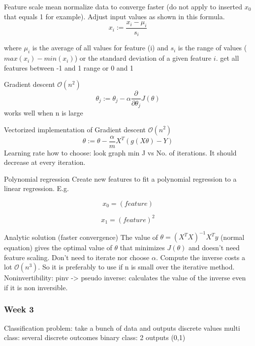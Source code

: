 \documentclass[12pt,a4paper]{report}
\begin{document}
Feature scale
	mean normalize data to converge faster (do not apply to inserted $ x_{0} $ that equals 1 for example). Adjust input values as shown in this formula.
	\begin{equation}
	x_{i} := \frac{x_{i}-\mu_{i}}{s_{i}}
	\end{equation}
	
	where $ \mu_{i} $ is the average of all values for feature (i) and $ s_{i} $ is the range of values ($ max(x_{i})-min(x_{i}) $) or the standard deviation of a given feature $ i $.
	get all features between -1 and 1 range or 0 and 1
	
Gradient descent $\mathcal{O}(n^{2})$
	\begin{equation}
	\theta_{j} := \theta_{j} - \alpha \frac{\partial}{\partial \theta_{j}}J(\theta)
	\end{equation}
	works well when n is large
	
Vectorized implementation of Gradient descent $\mathcal{O}(n^{2})$
	\begin{equation}
	\theta := \theta - \frac{\alpha}{m} X^{T}(g(X\theta)-Y)	
	\end{equation}
Learning rate
	how to choose: look graph min J vs No. of iterations. It should decrease at every iteration.

Polynomial regression
	Create new features to fit a polynomial regression to a linear regression.
	E.g.
	
	\begin{equation}
	x_{0} = (feature)
	\end{equation}
	
	\begin{equation}
	x_{1} = (feature)^{2}
	\end{equation}
	
	
Analytic solution (faster convergence)
	The value of $ \theta = (X^{T}X)^{-1}X^{T}y $ (normal equation) gives the optimal value of $\theta$ that minimizes $ J(\theta) $ and doesn't need feature scaling.
	Don't need to iterate nor choose $\alpha$.
	Compute the inverse costs a lot $\mathcal{O}(n^{3})$. So it is preferably to use if n is small over the iterative method.
	Noninvertibility: pinv -> pseudo inverse: calculates the value of the inverse even if it is non inversible. 
	
	\subsubsection{Week 3}
	
Classification problem: take a bunch of data and outputs discrete  values
	multi class: several discrete outcomes
	binary class: 2 outputs (0,1)
		
\end{document}
